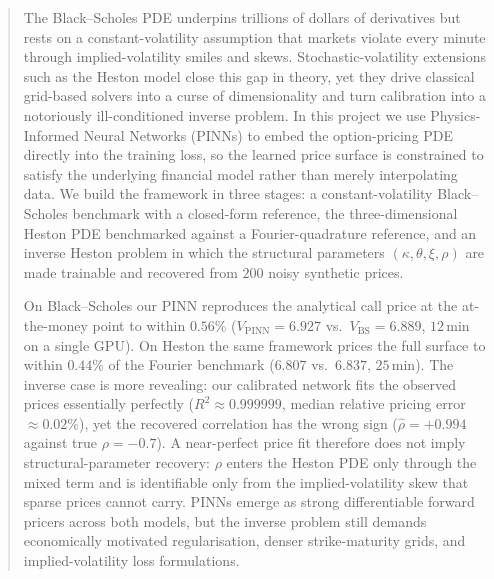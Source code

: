 \begin{abstract}
\noindent
The Black--Scholes PDE underpins trillions of dollars of derivatives but rests on a constant-volatility assumption that markets violate every minute through implied-volatility smiles and skews. Stochastic-volatility extensions such as the Heston model close this gap in theory, yet they drive classical grid-based solvers into a curse of dimensionality and turn calibration into a notoriously ill-conditioned inverse problem. In this project we use Physics-Informed Neural Networks (PINNs) to embed the option-pricing PDE directly into the training loss, so the learned price surface is constrained to satisfy the underlying financial model rather than merely interpolating data. We build the framework in three stages: a constant-volatility Black--Scholes benchmark with a closed-form reference, the three-dimensional Heston PDE benchmarked against a Fourier-quadrature reference, and an inverse Heston problem in which the structural parameters $(\kappa,\theta,\xi,\rho)$ are made trainable and recovered from $200$ noisy synthetic prices.

On Black--Scholes our PINN reproduces the analytical call price at the at-the-money point to within $0.56\%$ ($V_{\mathrm{PINN}}=6.927$ vs.\ $V_{\mathrm{BS}}=6.889$, $12$\,min on a single GPU). On Heston the same framework prices the full surface to within $0.44\%$ of the Fourier benchmark ($6.807$ vs.\ $6.837$, $25$\,min). The inverse case is more revealing: our calibrated network fits the observed prices essentially perfectly ($R^{2}\approx 0.999999$, median relative pricing error $\approx 0.02\%$), yet the recovered correlation has the wrong sign ($\hat{\rho}=+0.994$ against true $\rho=-0.7$). A near-perfect price fit therefore does not imply structural-parameter recovery: $\rho$ enters the Heston PDE only through the mixed term and is identifiable only from the implied-volatility skew that sparse prices cannot carry. PINNs emerge as strong differentiable forward pricers across both models, but the inverse problem still demands economically motivated regularisation, denser strike-maturity grids, and implied-volatility loss formulations.
\end{abstract}



